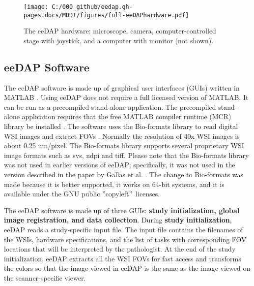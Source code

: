 \documentclass{article}%
\begin{document}
\begin{figure}[ptbh]
\label{fig_full-eeDAPhardware}
\texttt{[image: C:/000\_github/eedap.gh-pages.docs/MDDT/figures/full-eeDAPhardware.pdf]}\caption{The
eeDAP hardware: microscope, camera, computer-controlled stage with joystick,
and a computer with monitor (not shown).}%
\end{figure}

\subsection{eeDAP Software}

\label{eedap-software}

The eeDAP software is made up of graphical user interfaces (GUIs) written in
MATLAB \cite{MatlabRuntime2016}. Using eeDAP does not require a full licensed
version of MATLAB. It can be run as a precompiled stand-alone application. The
precompiled stand-alone application requires that the free MATLAB compiler
runtime (MCR) library be installed \cite{MatlabRuntime2016}. The software uses
the Bio-formats library to read digital WSI images and extract FOVs
\cite{BioFormats2016}. Normally the resolution of 40x WSI images is about 0.25
um/pixel. The Bio-formats library supports several proprietary WSI image
formats such as svs, ndpi and tiff. Please note that the Bio-formats library
was not used in earlier versions of eeDAP; specifically, it was not used in
the version described in the paper by Gallas et al.
\cite{Gallas2014_J-Med-Img_v1p037501}. The change to Bio-formats was made
because it is better supported, it works on 64-bit systems, and it is
available under the GNU public \textquotedblright copyleft\textquotedblright\ licenses.

The eeDAP software is made up of three GUIs: \textbf{study initialization,
global image registration, and data collection}. During \textbf{study
initialization}, eeDAP reads a study-specific input file. The input file
contains the filenames of the WSIs, hardware specifications, and the list of
tasks with corresponding FOV locations that will be interpreted by the
pathologist. At the end of the study initialization, eeDAP extracts all the
WSI FOVs for fast access and transforms the colors so that the image viewed in
eeDAP is the same as the image viewed on the scanner-specific viewer.
\end{document}
